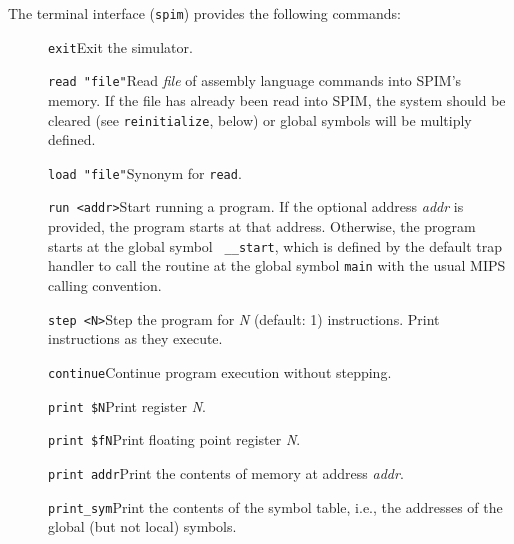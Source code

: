 \documentclass[11pt]{article}
\begin{document}
The terminal interface ({\tt spim}) provides the following commands:
\begin{description}
  \item [] {\tt exit}\newline Exit the simulator.

  \item [] {\tt read "file"}\newline Read {\em file\/} of assembly
language commands into SPIM's memory.  If the file has already been
read into SPIM, the system should be cleared (see {\tt reinitialize},
below) or global symbols will be multiply defined.

  \item [] {\tt load "file"}\newline Synonym for {\tt read}.

  \item [] {\tt run <addr>}\newline Start running a program.  If the
optional address {\em addr\/} is provided, the program starts at that
address.  Otherwise, the program starts at the global symbol {\tt
\_\_start}, which is defined by the default trap handler to call the
routine at the global symbol {\tt main} with the usual MIPS calling
convention.

  \item [] {\tt step <N>}\newline Step the program for {\em N\/}
(default: 1) instructions.  Print instructions as they execute.

  \item [] {\tt continue}\newline Continue program execution without
stepping.

  \item [] {\tt print \$N}\newline Print register {\em N\/}.

  \item [] {\tt print \$fN}\newline Print floating point register {\em
N\/}.

  \item [] {\tt print addr}\newline Print the contents of memory at
address {\em addr\/}.

  \item [] {\tt print\_sym}\newline Print the contents of the symbol
table, i.e., the addresses of the global (but not local) symbols.


\end{description}
\end{document}
